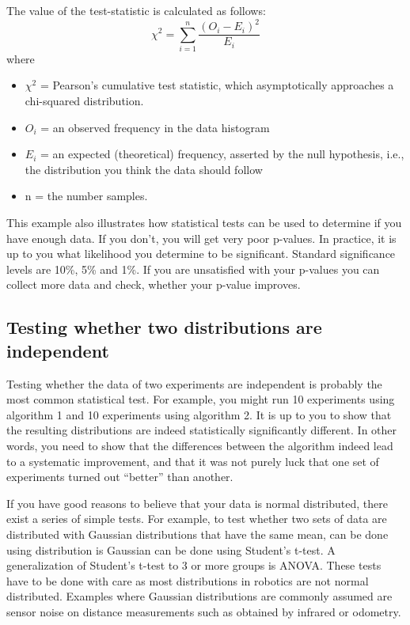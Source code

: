 The value of the test-statistic is calculated as follows:
\begin{equation}
\chi^2 = \sum_{i=1}^{n} \frac{(O_i - E_i)^2}{E_i}
\end{equation}
where
\begin{itemize}
\item $ \chi^2$ = Pearson's cumulative test statistic, which asymptotically approaches a chi-squared distribution.
\item $ O_i$ = an observed frequency in the data histogram
\item $ E_i$ = an expected (theoretical) frequency, asserted by the null hypothesis, i.e., the distribution you think the data should follow
\item n = the number samples.
\end{itemize}
This example also illustrates how statistical tests can be used to determine if you have enough data. If you don't, you will get very poor p-values.  In practice, it is up to you what likelihood you determine to be significant. Standard significance levels are 10\%, 5\% and 1\%. If you are unsatisfied with your p-values you can collect more data and check, whether your p-value improves.

\subsection{Testing whether two distributions are independent}
Testing whether the data of two experiments are independent is probably the most common statistical test. For example, you might run 10 experiments using algorithm 1 and 10 experiments using algorithm 2. It is up to you to show that the resulting distributions are indeed statistically significantly different. In other words, you need to show that the differences between the algorithm indeed lead to a systematic improvement, and that it was not purely luck that one set of experiments turned out ``better'' than another.

If you have good reasons to believe that your data is normal distributed, there exist a series of simple tests. For example, to test whether two sets of data are distributed with Gaussian  distributions that have the same mean, can be done using distribution is Gaussian can be done using  Student's t-test. A generalization of Student's t-test to 3 or more groups is ANOVA. These tests have to be done with care as most distributions in robotics are not normal distributed. Examples where  Gaussian distributions are commonly assumed are sensor noise on distance measurements such as obtained by infrared or odometry.

